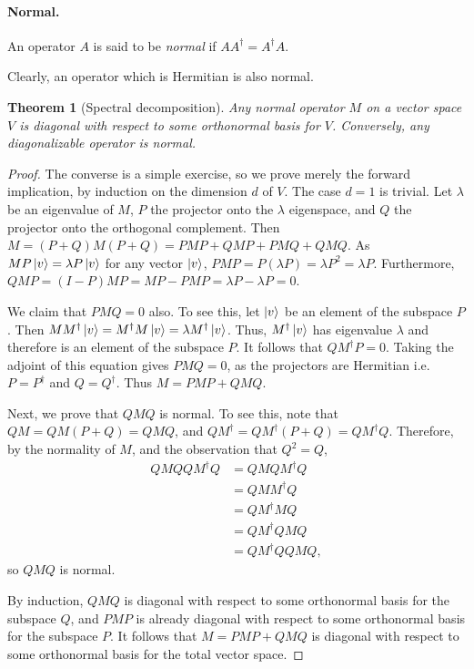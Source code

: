\documentclass{article}
\newtheorem{theorem}{Theorem}
\begin{document}
\paragraph{Normal.} An operator $A$ is said to be \emph{normal} if $A A^\dagger = A^\dagger A$.

Clearly, an operator which is Hermitian is also normal.

\begin{theorem}[Spectral decomposition]
  Any normal operator $M$ on a vector space $V$ is diagonal with respect to some orthonormal basis for $V$. Conversely, any diagonalizable operator is normal.
\end{theorem}
\begin{proof}
  The converse is a simple exercise, so we prove merely the forward implication, by induction on the dimension $d$ of $V$. The case $d = 1$ is trivial. Let $\lambda$ be an eigenvalue of $M$, $P$ the projector onto the $\lambda$ eigenspace, and $Q$ the projector onto the orthogonal complement. Then $M = (P + Q)M(P + Q) = PMP + QMP + PMQ + QMQ$. As $MP\ket{v} = \lambda P \ket{v}$ for any vector $\ket{v}$, $PMP = P(\lambda P) = \lambda P^2 = \lambda P$. Furthermore, $QMP = (I - P)MP = MP - PMP = \lambda P - \lambda P = 0$.

  We claim that $PMQ = 0$ also. To see this, let $\ket{v}$ be an element of the subspace $P$. Then $M M^\dagger \ket{v} = M^\dagger M \ket{v} = \lambda M^\dagger \ket{v}$. Thus, $M^\dagger \ket{v}$ has eigenvalue $\lambda$ and therefore is an element of the subspace $P$. It follows that $Q M^\dagger P = 0$. Taking the adjoint of this equation gives $PMQ = 0$, as the projectors are Hermitian i.e. $P = P^\dagger$ and $Q = Q^\dagger$. Thus $M = PMP + QMQ$.

  Next, we prove that $QMQ$ is normal. To see this, note that $QM = QM(P + Q) = QMQ$, and $Q M^\dagger = Q M^\dagger (P+Q) = Q M^\dagger Q$. Therefore, by the normality of $M$, and the observation that $Q^2 = Q$, \begin{align*}
    Q M Q Q M^\dagger Q &= Q M Q M^\dagger Q \\
      &= Q M M^\dagger Q \\
      &= Q M^\dagger M Q \\
      &= Q M^\dagger Q M Q \\
      &= Q M^\dagger Q Q M Q,
  \end{align*} so $QMQ$ is normal.

  By induction, $QMQ$ is diagonal with respect to some orthonormal basis for the subspace $Q$, and $PMP$ is already diagonal with respect to some orthonormal basis for the subspace $P$. It follows that $M = PMP + QMQ$ is diagonal with respect to some orthonormal basis for the total vector space.
\end{proof}
\end{document}
